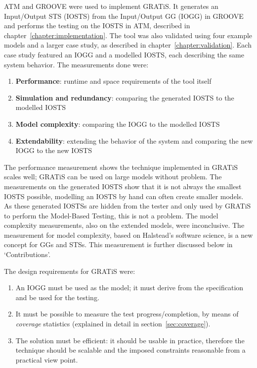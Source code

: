 ATM and GROOVE were used to implement GRATiS. It generates an Input/Output STS (IOSTS) from the Input/Output GG (IOGG) in GROOVE and performs the testing on the IOSTS in ATM, described in chapter~\ref{chapter:implementation}. The tool was also validated using four example models and a larger case study, as described in chapter~\ref{chapter:validation}. Each case study featured an IOGG and a modelled IOSTS, each describing the same system behavior. The measurements done were: 
\begin{enumerate}
\item \textbf{Performance}: runtime and space requirements of the tool itself
\item \textbf{Simulation and redundancy}: comparing the generated IOSTS to the modelled IOSTS
\item \textbf{Model complexity}: comparing the IOGG to the modelled IOSTS
\item \textbf{Extendability}: extending the behavior of the system and comparing the new IOGG to the new IOSTS
\end{enumerate}
The performance measurement shows the technique implemented in GRATiS scales well; GRATiS can be used on large models without problem. The measurements on the generated IOSTS show that it is not always the smallest IOSTS possible, modelling an IOSTS by hand can often create smaller models. As these generated IOSTSs are hidden from the tester and only used by GRATiS to perform the Model-Based Testing, this is not a problem. The model complexity measurements, also on the extended models, were inconclusive. The measurement for model complexity, based on Halstead's software science, is a new concept for GGs and STSs. This measurement is further discussed below in `Contributions'.

The design requirements for GRATiS were: 
\begin{enumerate}
\item An IOGG must be used as the model; it must derive from the specification and be used for the testing.
\item It must be possible to measure the test progress/completion, by means of \textit{coverage} statistics (explained in detail in section~\ref{sec:coverage}).
\item The solution must be efficient: it should be usable in practice, therefore the technique should be scalable and the imposed constraints reasonable from a practical view point.
\end{enumerate}

